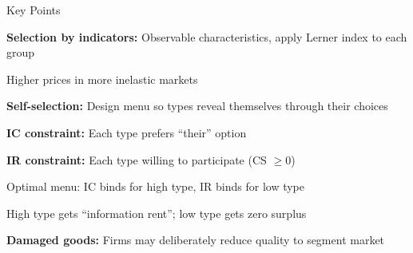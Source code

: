\documentclass[notes,11pt, aspectratio=169]{beamer}
\newenvironment{wideenumerate}{\enumerate\addtolength{\itemsep}{10pt}}{\endenumerate}
\begin{document}

\begin{frame}{Key Points}
	\vspace{11pt}
	\begin{wideenumerate}
		\item \textbf{Selection by indicators:} Observable characteristics, apply Lerner index to each group
		\item Higher prices in more inelastic markets
		\item \textbf{Self-selection:} Design menu so types reveal themselves through their choices
		\item \textbf{IC constraint:} Each type prefers ``their'' option
		\item \textbf{IR constraint:} Each type willing to participate (CS $\geq 0$)
		\item Optimal menu: IC binds for high type, IR binds for low type
		\item High type gets ``information rent''; low type gets zero surplus
		\item \textbf{Damaged goods:} Firms may deliberately reduce quality to segment market
	\end{wideenumerate}
\end{frame}
\end{document}
